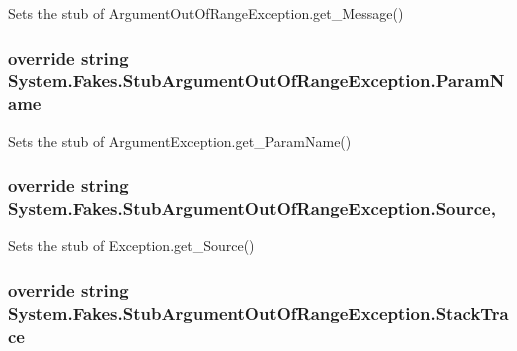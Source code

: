Sets the stub of Argument\-Out\-Of\-Range\-Exception.\-get\-\_\-\-Message()

\hypertarget{class_system_1_1_fakes_1_1_stub_argument_out_of_range_exception_a5ed090cb7e3a400334d5fc7d87debd07}{
\subsubsection[{Param\-Name}]{\setlength{\rightskip}{0pt plus 5cm}override string System.\-Fakes.\-Stub\-Argument\-Out\-Of\-Range\-Exception.\-Param\-Name\hspace{0.3cm}{\ttfamily [get]}}}\label{class_system_1_1_fakes_1_1_stub_argument_out_of_range_exception_a5ed090cb7e3a400334d5fc7d87debd07}


Sets the stub of Argument\-Exception.\-get\-\_\-\-Param\-Name()

\hypertarget{class_system_1_1_fakes_1_1_stub_argument_out_of_range_exception_af0a4d3e59f5225c7ffe81b5193692d13}{
\subsubsection[{Source}]{\setlength{\rightskip}{0pt plus 5cm}override string System.\-Fakes.\-Stub\-Argument\-Out\-Of\-Range\-Exception.\-Source\hspace{0.3cm}{\ttfamily [get]}, {\ttfamily [set]}}}\label{class_system_1_1_fakes_1_1_stub_argument_out_of_range_exception_af0a4d3e59f5225c7ffe81b5193692d13}


Sets the stub of Exception.\-get\-\_\-\-Source()

\hypertarget{class_system_1_1_fakes_1_1_stub_argument_out_of_range_exception_a3516636ac6320b0cfe32f1d937fb5c0a}{
\subsubsection[{Stack\-Trace}]{\setlength{\rightskip}{0pt plus 5cm}override string System.\-Fakes.\-Stub\-Argument\-Out\-Of\-Range\-Exception.\-Stack\-Trace\hspace{0.3cm}{\ttfamily [get]}}}\label{class_system_1_1_fakes_1_1_stub_argument_out_of_range_exception_a3516636ac6320b0cfe32f1d937fb5c0a}


